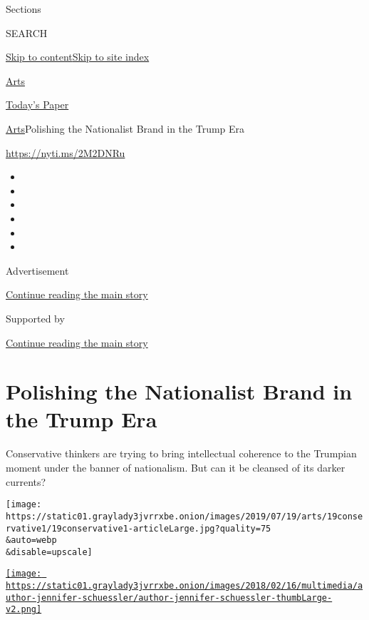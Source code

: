 Sections

SEARCH

\protect\hyperlink{site-content}{Skip to
content}\protect\hyperlink{site-index}{Skip to site index}

\href{https://www.nytimes3xbfgragh.onion/section/arts}{Arts}

\href{https://myaccount.nytimes3xbfgragh.onion/auth/login?response_type=cookie\&client_id=vi}{}

\href{https://www.nytimes3xbfgragh.onion/section/todayspaper}{Today's
Paper}

\href{/section/arts}{Arts}\textbar{}Polishing the Nationalist Brand in
the Trump Era

\url{https://nyti.ms/2M2DNRu}

\begin{itemize}
\item
\item
\item
\item
\item
\item
\end{itemize}

Advertisement

\protect\hyperlink{after-top}{Continue reading the main story}

Supported by

\protect\hyperlink{after-sponsor}{Continue reading the main story}

\hypertarget{polishing-the-nationalist-brand-in-the-trump-era}{%
\section{Polishing the Nationalist Brand in the Trump
Era}\label{polishing-the-nationalist-brand-in-the-trump-era}}

Conservative thinkers are trying to bring intellectual coherence to the
Trumpian moment under the banner of nationalism. But can it be cleansed
of its darker currents?

\texttt{[image: https://static01.graylady3jvrrxbe.onion/images/2019/07/19/arts/19conservative1/19conservative1-articleLarge.jpg?quality=75\\\&auto=webp\\\&disable=upscale]}

\href{https://www.nytimes3xbfgragh.onion/by/jennifer-schuessler}{\texttt{[image: https://static01.graylady3jvrrxbe.onion/images/2018/02/16/multimedia/author-jennifer-schuessler/author-jennifer-schuessler-thumbLarge-v2.png]}}

